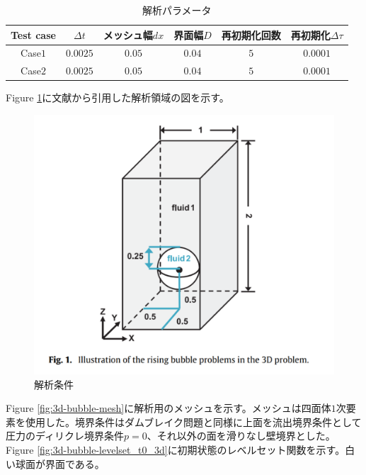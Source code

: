 \renewcommand{\arraystretch}{1}
\begin{table}[H]
	\centering
	\caption{解析パラメータ}
	\begin{tabular}{cccccc}
		\hline
		Test case & $\Delta t$ & メッシュ幅$dx$ & 界面幅$D$ & 再初期化回数 & 再初期化$\Delta \tau$\\
		\hline 
		Case$1$ & $0.0025$ & $0.05$ & $0.04$ & $5$ & $0.0001$\\
		Case$2$ & $0.0025$ & $0.05$ & $0.04$ & $5$ & $0.0001$\\
		\hline         
	\end{tabular}
	\label{table:3d-bubble-parameter}
\end{table}
\renewcommand{\arraystretch}{1.0}

Figure \ref{fig:3d-bubble-setting}に文献\cite{Safi2017}から引用した解析領域の図を示す。

\begin{figure}[H]
	\centering
	\includegraphics[width=10truecm]{pics/3d-bubble/setting.pdf}
	\caption{解析条件\cite{Safi2017}}
	\label{fig:3d-bubble-setting}
\end{figure}

Figure \ref{fig:3d-bubble-mesh}に解析用のメッシュを示す。メッシュは四面体$1$次要素を使用した。境界条件はダムブレイク問題と同様に上面を流出境界条件として圧力のディリクレ境界条件$p=0$、それ以外の面を滑りなし壁境界とした。
Figure \ref{fig:3d-bubble-levelset_t0_3d}に初期状態のレベルセット関数を示す。白い球面が界面である。

